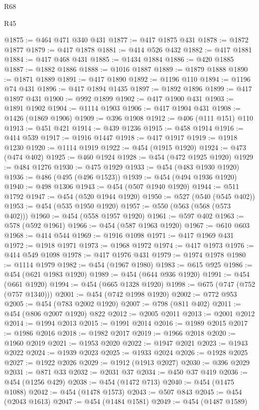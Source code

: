 \begin{lexlean}{R68}
\begin{lexlean}{R45}
\begin{coremodule}
{{{{{{{{{{{{{{{{{{{{{{{{{{{{{{{{{{{{{{{{{{{{{{{{{{{{{{{{{{{{{{{{{{{{{{{{{{{{{{{{{{{{{{{{{{{@1875 := @464 @471 @340 @431
@1877 := @417 @1875 @431
@1878 := @1872 @1877
@1879 := @417 @1878
@1881 := @414 @526 @432
@1882 := @417 @1881
@1884 := @417 @468 @431
@1885 := @1434 @1884
@1886 := @420 @1885
@1887 := @1882 @1886
@1888 := @1016 @1887
@1889 := @1879 @1888
@1890 := @1871 @1889
@1891 := @417 @1890
@1892 := @1196 @110
@1894 := @1196 @74 @431
@1896 := @417 @1894 @1435
@1897 := @1892 @1896
@1899 := @417 @1897 @431
@1900 := @992 @1899
@1902 := @417 @1900 @431
@1903 := @1891 @1902
@1904 := @1114 @1903
@1906 := @417 @1904 @431
@1908 := @1426 (@1869 @1906)
@1909 := @396 @1908
@1912 := @406 (@111 @151) @110
@1913 := @451 @421
@1914 := @439 @1236
@1915 := @458 @1914
@1916 := @414 @539
@1917 := @1916 @1447
@1918 := @417 @1917
@1919 := @1918 @1230
@1920 := @1114 @1919
@1922 := @454 (@1915 @1920)
@1924 := @473 (@474 @402)
@1925 := @460 @1924
@1928 := @454 (@472 @1925 @1920)
@1929 := @484 @1276
@1930 := @475 @1929
@1933 := @454 (@483 @1930 @1920)
@1936 := @486 (@495 (@496 @1523))
@1939 := @454 (@494 @1936 @1920)
@1940 := @498 @1306
@1943 := @454 (@507 @1940 @1920)
@1944 := @511 @1792
@1947 := @454 (@520 @1944 @1920)
@1950 := @527 (@540 (@545 @402))
@1953 := @454 (@535 @1950 @1920)
@1957 := @550 (@563 (@568 (@573 @402)))
@1960 := @454 (@558 @1957 @1920)
@1961 := @597 @402
@1963 := @578 (@592 @1961)
@1966 := @454 (@587 @1963 @1920)
@1967 := @610 @603
@1968 := @414 @544
@1969 := @1916 @1098
@1971 := @417 @1969 @431
@1972 := @1918 @1971
@1973 := @1968 @1972
@1974 := @417 @1973
@1976 := @414 @549 @1098
@1978 := @417 @1976 @431
@1979 := @1974 @1978
@1980 := @1114 @1979
@1982 := @454 (@1967 @1980)
@1983 := @615 @925
@1986 := @454 (@621 @1983 @1920)
@1989 := @454 (@644 @936 @1920)
@1991 := @454 (@661 @1920)
@1994 := @454 (@665 @1328 @1920)
@1998 := @675 (@747 (@752 (@757 @1340)))
@2001 := @454 (@742 @1998 @1920)
@2002 := @772 @953
@2005 := @454 (@783 @2002 @1920)
@2007 := @798 (@811 @402)
@2011 := @454 (@806 @2007 @1920) @822
@2012 := @2005 @2011
@2013 := @2001 @2012
@2014 := @1994 @2013
@2015 := @1991 @2014
@2016 := @1989 @2015
@2017 := @1986 @2016
@2018 := @1982 @2017
@2019 := @1966 @2018
@2020 := @1960 @2019
@2021 := @1953 @2020
@2022 := @1947 @2021
@2023 := @1943 @2022
@2024 := @1939 @2023
@2025 := @1933 @2024
@2026 := @1928 @2025
@2027 := @1922 @2026
@2029 := @1912 (@1913 @2027)
@2030 := @396 @2029
@2031 := @871 @33
@2032 := @2031 @37
@2034 := @450 @37 @419
@2036 := @454 (@1256 @429)
@2038 := @454 (@1472 @713)
@2040 := @454 (@1475 @1088)
@2042 := @454 (@1478 @1573)
@2043 := @507 @843
@2045 := @454 (@2043 @1613)
@2047 := @454 (@1484 @1581)
@2049 := @454 (@1487 @1589)
}}}}}}}}}}}}}}}}}}}}}}}}}}}}}}}}}}}}}}}}}}}}}}}}}}}}}}}}}}}}}}}}}}}}}}}}}}}}}}}}}}}}}}}}}}}
\end{coremodule}
\end{lexlean}
\end{lexlean}
